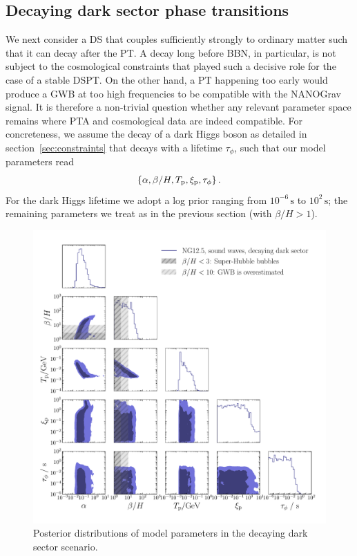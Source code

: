 \subsection{Decaying dark sector phase transitions}
\label{sec:results_decay}
We next consider a \ac{DS} that couples sufficiently strongly to ordinary matter such that it can decay after the \ac{PT}. A decay long before \ac{BBN}, in particular, is not subject to the cosmological constraints that played such a decisive role for the case of a stable \ac{DSPT}. On the other hand, a \ac{PT} happening too early would produce a \ac{GWB} at too high frequencies to  be compatible with the \ac{NANOGrav} signal. It is therefore a non-trivial question whether any relevant parameter space remains where \ac{PTA} and cosmological data are indeed compatible. For concreteness, we assume the decay of a dark Higgs boson as detailed in section~\ref{sec:constraints} that decays with a lifetime $\tau_\phi$, such that our model parameters read 
\begin{align}
	\{\alpha, \beta/H, T_{\text{p}}, \xi_{\text{p}}, \tau_\phi\} \, .
\end{align}
For the dark Higgs lifetime we adopt a log prior ranging from $10^{-6}\, \text{s}$ to $10^2 \, \text{s}$; the remaining parameters we treat as in the previous section (with $\beta/H>1$).

\begin{figure}[t]
	\centering
	\includegraphics[width=\linewidth]{thesisplots/ptbbn/ptbbn_5}
	\caption{Posterior distributions of model parameters in the decaying dark sector scenario.}
	\label{fig:dsdecay_logprior}
\end{figure}

